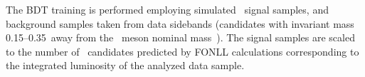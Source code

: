 \documentclass[11pt,twoside,a4paper,cmspaper]{cms-tdr}
\begin{document}
%
The BDT training is performed employing simulated \PB\ signal samples, and background samples taken from data sidebands (candidates with invariant mass 0.15--0.35\GeVcc\ away from the \PB\ meson nominal mass~\cite{pdg2018}). %
The signal samples are scaled to the number of \PB\ candidates predicted by FONLL calculations corresponding to the integrated luminosity of the analyzed data sample.


%

\end{document}
